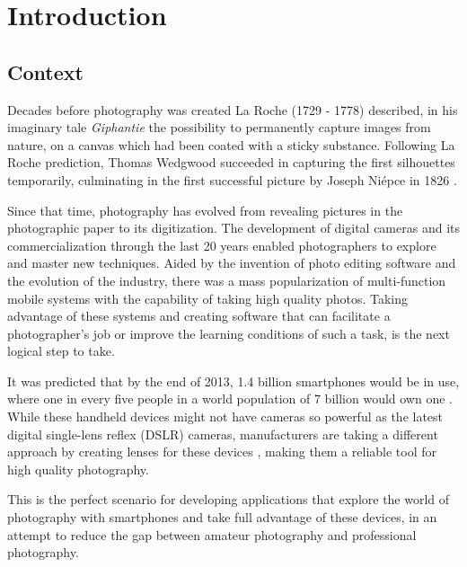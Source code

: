 \chapter{Introduction}
\label{cha:introduction}



\section{Context}
\label{sec:context}

Decades before photography was created La Roche (1729 - 1778) described, in his imaginary tale \emph{Giphantie} the possibility to permanently capture images from nature, on a canvas which had been coated with a sticky substance. Following La Roche prediction, Thomas Wedgwood succeeded in capturing the first silhouettes temporarily, culminating in the first successful picture by Joseph Niépce in 1826 \cite{lemagny1987history}. 

Since that time, photography has evolved from revealing pictures in the photographic paper to its digitization. The development of digital cameras and its commercialization through the last 20 years enabled photographers to explore and master new techniques.
Aided by the invention of photo editing software and the evolution of the industry, there was a mass popularization of multi-function mobile systems with the capability of taking high quality photos. 
Taking advantage of these systems and creating software that can facilitate a photographer's job or improve the learning conditions of such a task, is the next logical step to take.

It was predicted that by the end of 2013, 1.4 billion smartphones would be in use, where one in every five people in a world population of 7 billion would own one \cite{Leonard2013}. While these handheld devices might not have cameras so powerful as the latest digital single-lens reflex (DSLR) cameras, manufacturers are taking a different approach by creating lenses for these devices \cite{Bolton2013}, making them a reliable tool for high quality photography.

This is the perfect scenario for developing applications that explore the world of photography with smartphones and take full advantage of these devices, in an attempt to reduce the gap between amateur photography and professional photography.

